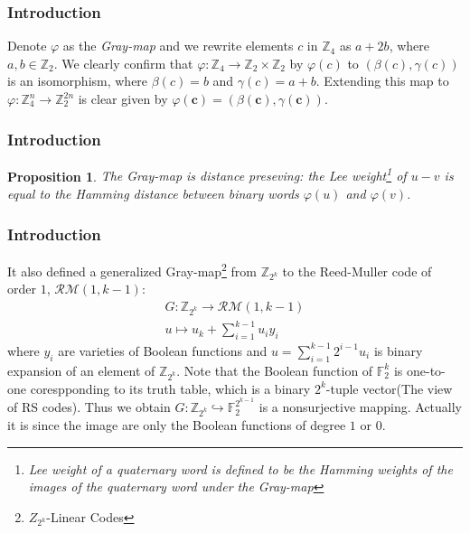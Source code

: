 \documentclass[
    aspectratio=169,                   %
]{beamer}
\renewcommand{\Bbb}{\mathbb}
\newtheorem{proposition}{Proposition}
\begin{document}
    \begin{frame}
        \frametitle{Introduction}
    
        \begin{definition}
            Denote $\varphi$ as the \textit{Gray-map} and we rewrite elements $c$ in $\Bbb Z_4$ as $a+2b$, where $a,b\in \Bbb Z_2$. We clearly confirm that $\varphi:\Bbb Z_4\rightarrow \Bbb Z_2\times\Bbb Z_2$ by $\varphi(c)$ to $(\beta(c),\gamma(c))$ is an isomorphism, where $\beta(c)=b$ and $\gamma(c)=a+b$. Extending this map to $\varphi:\Bbb Z_4^n\rightarrow\Bbb Z_2^{2n}$ is clear given by $\varphi(\boldsymbol{c})=(\beta(\boldsymbol{c}),\gamma(\boldsymbol{c}))$. 
        \end{definition}
    
    \end{frame}
    \begin{frame}
        \frametitle{Introduction}
    
        \begin{proposition}
            The Gray-map is distance preseving: the Lee weight\footnote{Lee weight of a quaternary word is defined to be the Hamming weights of the images of the quaternary word under the Gray-map} of $ u-v $ is equal to the Hamming distance between binary words $ \varphi(u) $ and $ \varphi(v) $.
        \end{proposition}
    
    \end{frame}
    \begin{frame}
        \frametitle{Introduction}
    
        It also defined a generalized Gray-map\footnote{$ Z_{2^k} $-Linear Codes} from $ \Bbb Z_{2^k} $ to the Reed-Muller code of order $ 1 $, $ \mathcal{RM}(1,k-1) $:
    \begin{align*}
        G:\Bbb Z_{2^k}\rightarrow \mathcal{RM}(1,k-1)\\
        u\longmapsto u_k+\sum_{i=1}^{k-1}u_iy_i
    \end{align*} 
    where $ y_i $ are varieties of Boolean functions and $ u=\sum_{i=1}^{k-1}2^{i-1}u_i $ is binary expansion of an element of $ \Bbb Z_{2^k} $. Note that the Boolean function of $ \Bbb F_{2}^{k} $ is one-to-one corespponding to its truth table, which is a binary $ 2^k $-tuple vector(The view of RS codes). Thus we obtain $ G:\Bbb Z_{2^k}\hookrightarrow \Bbb F_2^{2^{k-1}}  $ is a nonsurjective mapping. Actually it is since the image are only the Boolean functions of degree $ 1 $ or $ 0 $.
    
    \end{frame}
\end{document}
